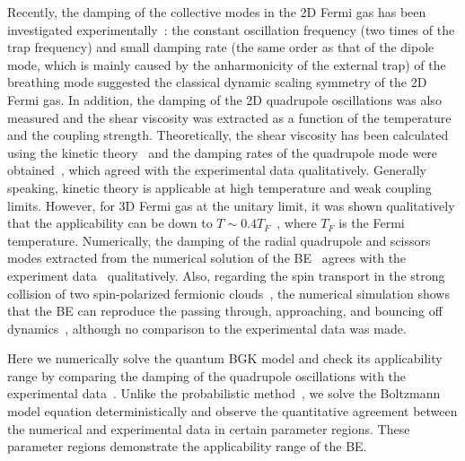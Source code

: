 Recently, the damping of the collective modes in the 2D Fermi gas has been investigated experimentally~\cite{Vogt2012}: the constant oscillation frequency (two times of the trap frequency) and small damping rate (the same order as that of the dipole mode, which is mainly caused by the anharmonicity of the external trap) of the breathing mode suggested the classical dynamic scaling symmetry of the 2D Fermi gas. In addition, the damping of the 2D quadrupole oscillations was also measured and the shear viscosity was extracted as a function of the temperature and the coupling strength. Theoretically, the shear viscosity has been calculated using the kinetic theory~\cite{bruun_2012, arxiv_sch} and the damping rates of the quadrupole mode were obtained~\cite{bruun_2012}, which agreed with the experimental data qualitatively. Generally speaking, kinetic theory is applicable at high temperature and weak coupling limits. However, for 3D Fermi gas at the unitary limit, it was shown qualitatively that the applicability can be down to $T\sim0.4T_F$~\cite{Massignan2005}, where $T_F$ is the Fermi temperature. Numerically, the damping of the radial quadrupole and scissors modes extracted from the numerical solution of the BE~\cite{Lepers2010,Chiacchiera2011} agrees with the experiment data~\cite{Riedl2008} qualitatively. Also, regarding the spin transport in the strong collision of two spin-polarized fermionic clouds~\cite{Somme2011, Sommer2011b}, the numerical simulation shows that the BE can reproduce the passing through, approaching, and bouncing off dynamics~\cite{Goulko2011}, although no comparison to the experimental data was made.

Here we numerically solve the quantum BGK model and check its applicability range by comparing the damping of the quadrupole oscillations with the experimental data~\cite{Vogt2012}. Unlike the probabilistic method~\cite{Goulko2011}, we solve the Boltzmann model equation deterministically and observe the quantitative agreement between the numerical and experimental data in certain parameter regions. These parameter regions demonstrate the applicability range of the BE.

